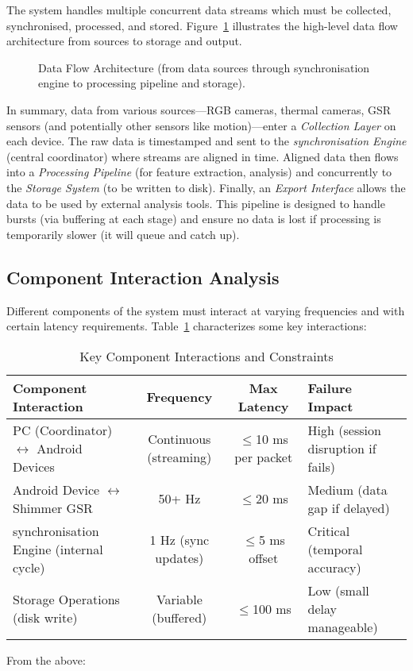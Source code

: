 \documentclass[11pt,a4paper]{report}
\begin{document}
The system handles multiple concurrent data streams which must be collected, synchronised, processed, and stored. Figure~\ref{fig:data_flow} illustrates the high-level data flow architecture from sources to storage and output. %
\begin{figure}[h]
\centering
\fbox{\rule{0pt}{0.2\textheight}\rule{0.9\textwidth}{0pt}}
\caption{Data Flow Architecture (from data sources through synchronisation engine to processing pipeline and storage).}
\label{fig:data_flow}
\end{figure} In summary, data from various sources---RGB cameras, thermal cameras, GSR sensors (and potentially other sensors like motion)---enter a \textit{Collection Layer} on each device. The raw data is timestamped and sent to the \textit{synchronisation Engine} (central coordinator) where streams are aligned in time. Aligned data then flows into a \textit{Processing Pipeline} (for feature extraction, analysis) and concurrently to the \textit{Storage System} (to be written to disk). Finally, an \textit{Export Interface} allows the data to be used by external analysis tools. This pipeline is designed to handle bursts (via buffering at each stage) and ensure no data is lost if processing is temporarily slower (it will queue and catch up). \subsection{Component Interaction Analysis}
Different components of the system must interact at varying frequencies and with certain latency requirements. Table~\ref{tab:comp_interaction} characterizes some key interactions: \begin{table}[h]
\centering
\caption{Key Component Interactions and Constraints}
\label{tab:comp_interaction}
\begin{tabular}{l c c l}
\toprule
\textbf{Component Interaction} & \textbf{Frequency} & \textbf{Max Latency} & \textbf{Failure Impact} \\
\midrule
PC (Coordinator) $\leftrightarrow$ Android Devices & Continuous (streaming) & $\leq$10 ms per packet & High (session disruption if fails) \\
Android Device $\leftrightarrow$ Shimmer GSR & 50+ Hz & $\leq$20 ms & Medium (data gap if delayed) \\
synchronisation Engine (internal cycle) & 1 Hz (sync updates) & $\leq$5 ms offset & Critical (temporal accuracy) \\
Storage Operations (disk write) & Variable (buffered) & $\leq$100 ms & Low (small delay manageable) \\
\bottomrule
\end{tabular}
\end{table} From the above:
\end{document}
